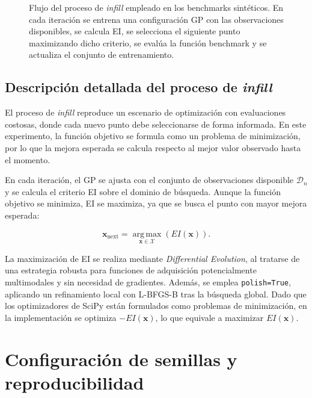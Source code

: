 \begin{figure}[htbp]
{%
}
\caption[Flujo del proceso de infill]{Flujo del proceso de \emph{infill} empleado en los benchmarks sintéticos. En cada iteración se entrena una configuración GP con las observaciones disponibles, se calcula EI, se selecciona el siguiente punto maximizando dicho criterio, se evalúa la función benchmark y se actualiza el conjunto de entrenamiento.}
\label{fig:app_flujo_infill}

\end{figure}
\FloatBarrier

\subsection*{Descripción detallada del proceso de \emph{infill}}

El proceso de \emph{infill} reproduce un escenario de optimización con evaluaciones costosas, donde cada nuevo punto debe seleccionarse de forma informada. En este experimento, la función objetivo se formula como un problema de minimización, por lo que la mejora esperada se calcula respecto al mejor valor observado hasta el momento.

En cada iteración, el GP se ajusta con el conjunto de observaciones disponible \(\mathcal{D}_n\) y se calcula el criterio EI sobre el dominio de búsqueda. Aunque la función objetivo se minimiza, EI se maximiza, ya que se busca el punto con mayor mejora esperada:

\[
\bm{x}_{\mathrm{next}}
=
\operatorname*{arg\,max}_{\bm{x}\in\mathcal{X}} (EI(\bm{x})).
\]

La maximización de EI se realiza mediante \emph{Differential Evolution}, al tratarse de una estrategia robusta para funciones de adquisición potencialmente multimodales y sin necesidad de gradientes. Además, se emplea \texttt{polish=True}, aplicando un refinamiento local con L-BFGS-B tras la búsqueda global. Dado que los optimizadores de SciPy están formulados como problemas de minimización, en la implementación se optimiza $-EI(\bm{x})$, lo que equivale a maximizar $EI(\bm{x})$.
\newpage
\section{Configuración de semillas y reproducibilidad}
\label{app:semillas_benchmarks}

